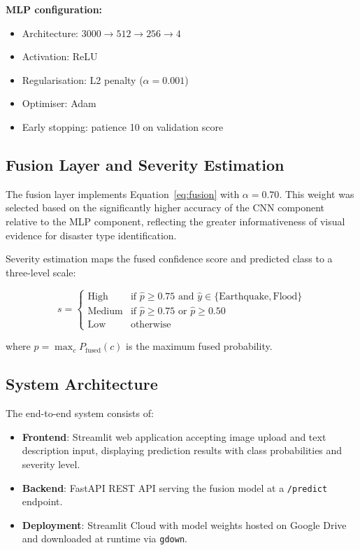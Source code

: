 \documentclass[conference]{IEEEtran}
\begin{document}
\textbf{MLP configuration:}
\begin{itemize}
    \item Architecture: $3000 \rightarrow 512 \rightarrow 256 \rightarrow 4$
    \item Activation: ReLU
    \item Regularisation: L2 penalty ($\alpha = 0.001$)
    \item Optimiser: Adam
    \item Early stopping: patience 10 on validation score
\end{itemize}

\subsection{Fusion Layer and Severity Estimation}

The fusion layer implements Equation~\ref{eq:fusion} with $\alpha = 0.70$. This weight was selected based on the significantly higher accuracy of the CNN component relative to the MLP component, reflecting the greater informativeness of visual evidence for disaster type identification.

Severity estimation maps the fused confidence score and predicted class to a three-level scale:

\begin{equation}
s = \begin{cases}
\text{High}   & \text{if } \hat{p} \geq 0.75 \text{ and } \hat{y} \in \{\text{Earthquake}, \text{Flood}\} \\
\text{Medium} & \text{if } \hat{p} \geq 0.75 \text{ or } \hat{p} \geq 0.50 \\
\text{Low}    & \text{otherwise}
\end{cases}
\end{equation}

where $\hat{p} = \max_c P_{\text{fused}}(c)$ is the maximum fused probability.

\subsection{System Architecture}

The end-to-end system consists of:
\begin{itemize}
    \item \textbf{Frontend}: Streamlit web application accepting image upload and text description input, displaying prediction results with class probabilities and severity level.
    \item \textbf{Backend}: FastAPI REST API serving the fusion model at a \texttt{/predict} endpoint.
    \item \textbf{Deployment}: Streamlit Cloud with model weights hosted on Google Drive and downloaded at runtime via \texttt{gdown}.
\end{itemize}
\end{document}
